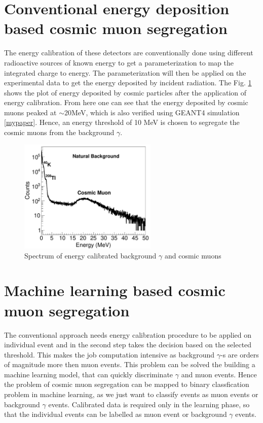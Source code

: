 \documentclass[twocolumn,amsmath,amssymb]{snp}
\begin{document}
\section*{Conventional energy deposition based cosmic muon segregation}
The energy calibration of these detectors are conventionally done using different radioactive sources of known energy to get a parameterization to map the integrated charge to energy. The parameterization will then be applied on the experimental data to get the energy deposited by incident radiation. The Fig. \ref{calib} shows the plot of energy deposited by cosmic particles after the application of energy calibration. From here one can see that the energy deposited by cosmic muons peaked at $\sim$20MeV, which is also verified using GEANT4 simulation \ref{mypaper}. Hence, an energy threshold of 10 MeV is chosen to segregate the cosmic muons from the background $\gamma$.
\begin{figure}
\includegraphics[width=66mm]{calibrated.pdf}%
\caption{\label{calib} Spectrum of energy calibrated background $\gamma$ and cosmic muons}
\end{figure}

\section*{Machine learning based cosmic muon segregation}
The conventional approach needs energy calibration procedure to be applied on individual event and in the second step takes the decision based on the selected threshold. This makes the job computation intensive as background $\gamma$-s are orders of magnitude more then muon events. This problem can be solved the building a machine learning model, that can quickly discriminate $\gamma$ and muon events. Hence the problem of cosmic muon segregation can be mapped to binary classfication problem in machine learning, as we just want to classify events as muon events or background $\gamma$ events. Calibrated data is required only in the learning phase, so that the individual events can be labelled as muon event or background $\gamma$ events.
\end{document}
